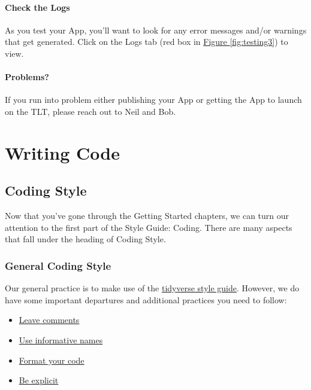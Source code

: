 \documentclass[
]{book}
\providecommand{\tightlist}{%
  \setlength{\itemsep}{0pt}\setlength{\parskip}{0pt}}
\begin{document}
\hypertarget{check-the-logs}{%
\subsection{Check the Logs}\label{check-the-logs}}

As you test your App, you'll want to look for any error messages and/or warnings that get generated. Click on the Logs tab (red box in \protect\hyperlink{fig:testing3}{Figure \ref{fig:testing3}}) to view.

\hypertarget{problems}{%
\subsection{Problems?}\label{problems}}

If you run into problem either publishing your App or getting the App to launch on the TLT, please reach out to Neil and Bob.

\hypertarget{part-writing-code}{%
\part{Writing Code}\label{part-writing-code}}

\hypertarget{coding}{%
\chapter{Coding Style}\label{coding}}

Now that you've gone through the Getting Started chapters, we can turn our attention to the first part of the Style Guide: Coding. There are many aspects that fall under the heading of Coding Style.

\hypertarget{genCode}{%
\section{General Coding Style}\label{genCode}}

Our general practice is to make use of the \href{https://style.tidyverse.org/}{tidyverse style guide}. However, we do have some important departures and additional practices you need to follow:

\begin{itemize}
\tightlist
\item
  \protect\hyperlink{comments}{Leave comments}
\item
  \protect\hyperlink{naming}{Use informative names}
\item
  \protect\hyperlink{formatCode}{Format your code}
\item
  \protect\hyperlink{explicit}{Be explicit}
\end{itemize}
\end{document}
